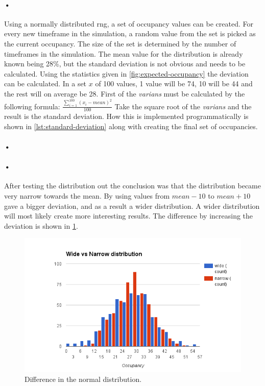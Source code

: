 \documentclass[a4paper, 12pt]{report}
\begin{document}
\paragraph{•}
Using a normally distributed \gls{rng}, a set of occupancy values can be created.
For every new timeframe in the simulation, a random value from the set is picked as the current occupancy.
The size of the set is determined by the number of timeframes in the simulation.
The mean value for the distribution is already known being 28\%, but the standard deviation is not obvious and needs to be calculated.
Using the statistics given in \ref{fig:expected-occupancy} the deviation can be calculated.
In a set $x$ of 100 values, 1 value will be 74, 10 will be 44 and the rest will on average be 28.
First of the \textit{varians} must be calculated by the following formula:
$ \frac{\sum_{i=1}^{100} (x_i - mean)^2}{100}$
Take the square root of the \textit{varians} and the result is the standard deviation.
How this is implemented programmatically is shown in \ref{lst:standard-deviation} along with creating the final set of occupancies.

\paragraph{•}
\begin{minipage}{\linewidth}

\end{minipage}

\paragraph{•}
After testing the distribution out the conclusion was that the distribution became very narrow towards the mean.
By using values from $mean-10$ to $mean+10$ gave a bigger deviation, and as a result a wider distribution.
A wider distribution will most likely create more interesting results.
The difference by increasing the deviation is shown in \ref{fig:distribution}.

\begin{figure}[h!]
	\centering
		\includegraphics[width=1.0\textwidth]{images/normal-dist-diff.png}
		\caption{Difference in the normal distribution.}
		\label{fig:distribution}
\end{figure}
\end{document}
